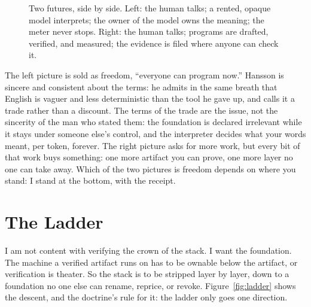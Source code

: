 \documentclass[11pt]{article}
\begin{document}
\begin{figure}[H]
\caption{Two futures, side by side. Left: the human talks; a rented,
opaque model interprets; the owner of the model owns the meaning; the
meter never stops. Right: the human talks; programs are drafted,
verified, and measured; the evidence is filed where anyone can check
it.}
\label{fig:futures}
\end{figure}

The left picture is sold as freedom, ``everyone can program now.''
Hansson is sincere and consistent about the terms: he admits in the
same breath that English is vaguer and less deterministic than the tool
he gave up, and calls it a trade rather than a discount\cite{dhh-keynote}.
The terms of the trade are the issue, not the sincerity of the man who
stated them: the foundation is declared irrelevant while it stays under
someone else's control, and the interpreter decides what your words
meant, per token, forever. The right picture asks for more work, but every
bit of that work buys something: one more artifact you can prove,
one more layer no one can take away. Which of the two pictures is
freedom depends on where you stand: I stand at the bottom,
with the receipt.

\section{The Ladder}

I am not content with verifying the crown of the stack. I
want the foundation. The machine a verified artifact runs on has to
be ownable below the artifact, or verification is theater. So the
stack is to be stripped layer by layer, down to a foundation no one
else can rename, reprice, or revoke. Figure~\ref{fig:ladder} shows
the descent, and the doctrine's rule for it: the ladder only goes one
direction.
\end{document}
